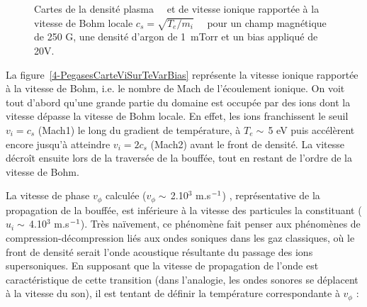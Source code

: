 \begin{refsection}
\begin{figure}[!htbp] 
  \centering
    \caption{Cartes de la densité plasma~~ et
    de vitesse ionique rapportée à la
    vitesse de Bohm locale
    $c_s=\sqrt{T_e/m_i}$~~ pour un champ
    magnétique de 250 G, une densité d'argon de 1~mTorr et un bias appliqué de
    20V.}
    \label{4-PegasesVaguesIoniques}
\end{figure}
 
 La figure~\ref{4-PegasesCarteViSurTeVarBias} représente la vitesse ionique
 rapportée à la vitesse de Bohm, i.e. le nombre de Mach de
 l'écoulement ionique. On voit tout d'abord qu'une grande partie du domaine est
 occupée par des ions dont la vitesse dépasse la vitesse de Bohm locale. En
 effet, les ions franchissent le seuil $v_i=c_s$ (Mach1) le long du gradient de
 température, à $T_e\sim\,$5 eV puis accélèrent encore jusqu'à atteindre
 $v_i=2c_s$ (Mach2) avant le front de densité. La vitesse décroît ensuite lors
 de la traversée de la bouffée, tout en restant de l'ordre de la vitesse de
 Bohm.
 
 La vitesse de phase $v_\phi$ calculée ($v_\phi\sim\,$2.10$^3$
 m.s$^{{-1}}$) , représentative de la propagation de la bouffée, est inférieure à la
 vitesse des particules la constituant ($u_i\sim\,$4.10$^3$
 m.s$^{{-1}}$). Très naïvement, ce phénomène fait penser aux phénomènes
 de compression-décompression liés aux ondes soniques dans les gaz
 classiques, où le front de densité serait l'onde acoustique
 résultante du passage des ions supersoniques. En supposant que la vitesse de
 propagation de l'onde est caractéristique de cette transition (dans
 l'analogie, les ondes sonores se déplacent à la vitesse du son), il est
 tentant de définir la température correspondante à $v_\phi$ :
 

\end{refsection}
